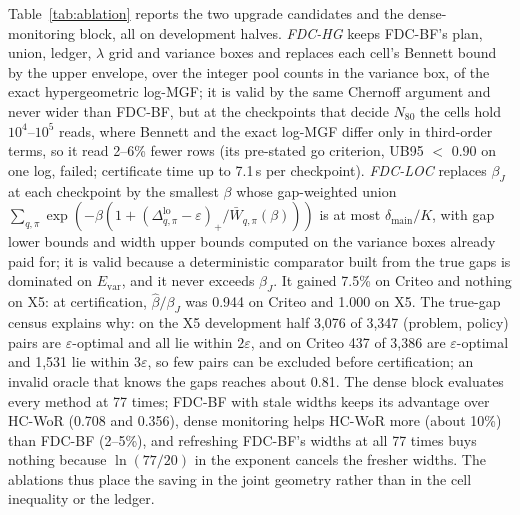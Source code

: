 \documentclass[sigconf,anonymous,review]{acmart}
\newcommand{\eps}{\varepsilon}
\newcommand{\dmain}{\delta_{\text{main}}}
\begin{document}
Table~\ref{tab:ablation} reports the two upgrade candidates and the dense-monitoring block, all on development halves. \emph{FDC-HG} keeps FDC-BF's plan, union, ledger, $\lambda$ grid and variance boxes and replaces each cell's Bennett bound by the upper envelope, over the integer pool counts in the variance box, of the exact hypergeometric log-MGF; it is valid by the same Chernoff argument and never wider than FDC-BF, but at the checkpoints that decide $N_{80}$ the cells hold $10^4$--$10^5$ reads, where Bennett and the exact log-MGF differ only in third-order terms, so it read 2--6\% fewer rows (its pre-stated go criterion, UB95 $<$ 0.90 on one log, failed; certificate time up to 7.1\,s per checkpoint). \emph{FDC-LOC} replaces $\beta_J$ at each checkpoint by the smallest $\beta$ whose gap-weighted union $\sum_{q,\pi}\exp(-\beta(1 + (\Delta^{\text{lo}}_{q,\pi} - \eps)_+/\bar W_{q,\pi}(\beta)))$ is at most $\dmain/K$, with gap lower bounds and width upper bounds computed on the variance boxes already paid for; it is valid because a deterministic comparator built from the true gaps is dominated on $E_{\text{var}}$, and it never exceeds $\beta_J$. It gained 7.5\% on Criteo and nothing on X5: at certification, $\hat\beta/\beta_J$ was 0.944 on Criteo and 1.000 on X5. The true-gap census explains why: on the X5 development half 3,076 of 3,347 (problem, policy) pairs are $\eps$-optimal and all lie within $2\eps$, and on Criteo 437 of 3,386 are $\eps$-optimal and 1,531 lie within $3\eps$, so few pairs can be excluded before certification; an invalid oracle that knows the gaps reaches about 0.81. The dense block evaluates every method at 77 times; FDC-BF with stale widths keeps its advantage over HC-WoR (0.708 and 0.356), dense monitoring helps HC-WoR more (about 10\%) than FDC-BF (2--5\%), and refreshing FDC-BF's widths at all 77 times buys nothing because $\ln(77/20)$ in the exponent cancels the fresher widths. The ablations thus place the saving in the joint geometry rather than in the cell inequality or the ledger.
\end{document}
